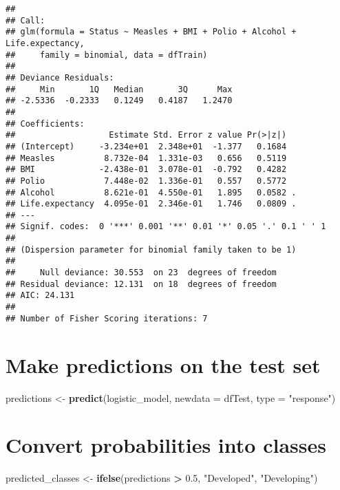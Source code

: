 \documentclass[
]{article}
\newenvironment{Shaded}{\begin{snugshade}}{\end{snugshade}}
\newcommand{\AttributeTok}[1]{\textcolor[rgb]{0.13,0.29,0.53}{#1}}
\newcommand{\FloatTok}[1]{\textcolor[rgb]{0.00,0.00,0.81}{#1}}
\newcommand{\FunctionTok}[1]{\textcolor[rgb]{0.13,0.29,0.53}{\textbf{#1}}}
\newcommand{\NormalTok}[1]{#1}
\newcommand{\OtherTok}[1]{\textcolor[rgb]{0.56,0.35,0.01}{#1}}
\newcommand{\SpecialCharTok}[1]{\textcolor[rgb]{0.81,0.36,0.00}{\textbf{#1}}}
\newcommand{\StringTok}[1]{\textcolor[rgb]{0.31,0.60,0.02}{#1}}
\begin{document}
\begin{verbatim}
## 
## Call:
## glm(formula = Status ~ Measles + BMI + Polio + Alcohol + Life.expectancy, 
##     family = binomial, data = dfTrain)
## 
## Deviance Residuals: 
##     Min       1Q   Median       3Q      Max  
## -2.5336  -0.2333   0.1249   0.4187   1.2470  
## 
## Coefficients:
##                   Estimate Std. Error z value Pr(>|z|)  
## (Intercept)     -3.234e+01  2.348e+01  -1.377   0.1684  
## Measles          8.732e-04  1.331e-03   0.656   0.5119  
## BMI             -2.438e-01  3.078e-01  -0.792   0.4282  
## Polio            7.448e-02  1.336e-01   0.557   0.5772  
## Alcohol          8.621e-01  4.550e-01   1.895   0.0582 .
## Life.expectancy  4.095e-01  2.346e-01   1.746   0.0809 .
## ---
## Signif. codes:  0 '***' 0.001 '**' 0.01 '*' 0.05 '.' 0.1 ' ' 1
## 
## (Dispersion parameter for binomial family taken to be 1)
## 
##     Null deviance: 30.553  on 23  degrees of freedom
## Residual deviance: 12.131  on 18  degrees of freedom
## AIC: 24.131
## 
## Number of Fisher Scoring iterations: 7
\end{verbatim}

\section{Make predictions on the test
set}\label{make-predictions-on-the-test-set}

\begin{Shaded}
\begin{Highlighting}[]
\NormalTok{predictions }\OtherTok{\textless{}{-}} \FunctionTok{predict}\NormalTok{(logistic\_model, }\AttributeTok{newdata =}\NormalTok{ dfTest, }\AttributeTok{type =} \StringTok{"response"}\NormalTok{)}
\end{Highlighting}
\end{Shaded}

\section{Convert probabilities into
classes}\label{convert-probabilities-into-classes}

\begin{Shaded}
\begin{Highlighting}[]
\NormalTok{predicted\_classes }\OtherTok{\textless{}{-}} \FunctionTok{ifelse}\NormalTok{(predictions }\SpecialCharTok{\textgreater{}} \FloatTok{0.5}\NormalTok{, }\StringTok{"Developed"}\NormalTok{, }\StringTok{"Developing"}\NormalTok{)}
\end{Highlighting}
\end{Shaded}
\end{document}
